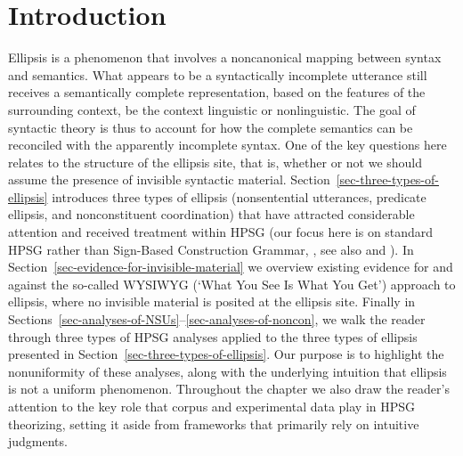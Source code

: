 



\maketitle
\label{chap-ellipsis}

{

\section{Introduction}
\label{ellipsis-sec-introduction}

Ellipsis is a phenomenon that involves a noncanonical mapping between syntax and semantics. What appears to be a syntactically incomplete utterance still receives a semantically complete representation, based on the features of the surrounding context, be the context linguistic or nonlinguistic. The goal of syntactic theory is thus to account for how the complete semantics can be reconciled with the apparently incomplete syntax. One of the key questions here relates to the structure of the ellipsis site, that is, whether or not we should assume the presence of invisible syntactic material. Section~\ref{sec-three-types-of-ellipsis} introduces three types of ellipsis (nonsentential utterances, predicate ellipsis, and nonconstituent coordination) that have attracted considerable attention and received treatment within HPSG (our focus here is on standard HPSG rather than Sign-Based Construction Grammar, \citealt{Sag2012}, see also  and ). 
 In Section~\ref{sec-evidence-for-invisible-material} we overview existing evidence for and against the so-called WYSIWYG (`What You See Is What You Get') approach to ellipsis, where no invisible material is posited at the ellipsis site. Finally in Sections~\ref{sec-analyses-of-NSUs}--\ref{sec-analyses-of-noncon}, we walk the reader through three types of HPSG analyses applied to the three types of ellipsis presented in Section~\ref{sec-three-types-of-ellipsis}. Our purpose is to highlight the nonuniformity of these analyses, along with the underlying intuition that ellipsis is not a uniform phenomenon. Throughout the chapter we also draw the reader's attention to the key role that corpus and experimental data play in HPSG theorizing, setting it aside from frameworks that primarily rely on intuitive judgments.


}
